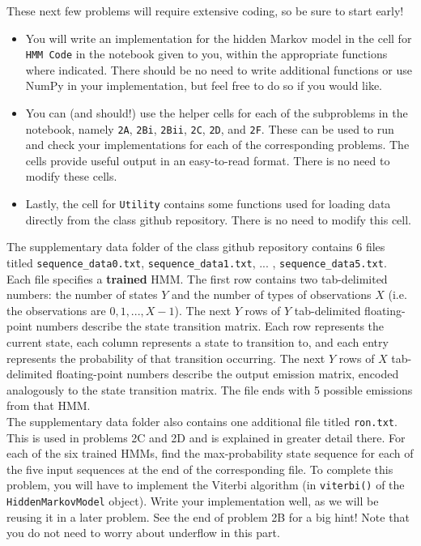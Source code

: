These next few problems will require extensive coding, so be sure to start early! 
\begin{itemize}
  \item You will write an implementation for the hidden Markov model in the cell for \texttt{HMM Code} in the notebook given to you, within the appropriate functions where indicated. There should be no need to write additional functions or use NumPy in your implementation, but feel free to do so if you would like.
  \item You can (and should!) use the helper cells for each of the subproblems in the notebook, namely \texttt{2A}, \texttt{2Bi}, \texttt{2Bii}, \texttt{2C}, \texttt{2D}, and \texttt{2F}. These can be used to run and check your implementations for each of the corresponding problems. The cells provide useful output in an easy-to-read format. There is no need to modify these cells.
  \item Lastly, the cell for \texttt{Utility} contains some functions used for loading data directly from the class github repository. There is no need to modify this cell. \\
\end{itemize}

The supplementary data folder of the class github repository contains 6 files titled \texttt{sequence_data0.txt}, \texttt{sequence_data1.txt}, ... , \texttt{sequence_data5.txt}. Each file specifies a \textbf{trained} HMM. The first row contains two tab-delimited numbers: the number of states $Y$ and the number of types of observations $X$ (i.e. the observations are $0, 1, . . . , X - 1$). The next $Y$ rows of $Y$ tab-delimited floating-point numbers describe the state transition matrix. Each row represents the current state, each column represents a state to transition to, and each entry represents the probability of that transition occurring. The next $Y$ rows of $X$ tab-delimited floating-point numbers describe the output emission matrix, encoded analogously to the state transition matrix. The file ends with 5 possible emissions from that HMM. \\

The supplementary data folder also contains one additional file titled \texttt{ron.txt}. This is used in problems 2C and 2D and is explained in greater detail there.
\newpage 
\problem[10] %
For each of the six trained HMMs, find the max-probability state sequence for each of the five input sequences at the end of the corresponding file. To complete this problem, you will have to implement the Viterbi algorithm (in \texttt{viterbi()} of the \texttt{HiddenMarkovModel} object). Write your implementation well, as we will be reusing it in a later problem. See the end of problem 2B for a big hint! Note that you do not need to worry about underflow in this part.

